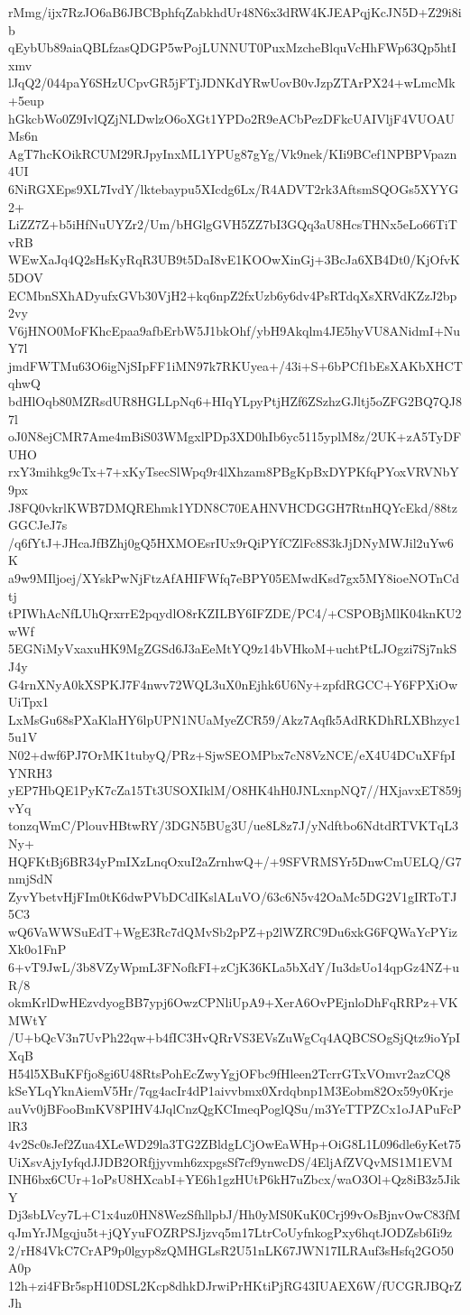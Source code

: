rMmg/ijx7RzJO6aB6JBCBphfqZabkhdUr48N6x3dRW4KJEAPqjKcJN5D+Z29i8ib
qEybUb89aiaQBLfzasQDGP5wPojLUNNUT0PuxMzcheBlquVcHhFWp63Qp5htIxmv
lJqQ2/044paY6SHzUCpvGR5jFTjJDNKdYRwUovB0vJzpZTArPX24+wLmcMk+5eup
hGkcbWo0Z9IvlQZjNLDwlzO6oXGt1YPDo2R9eACbPezDFkcUAIVljF4VUOAUMs6n
AgT7hcKOikRCUM29RJpyInxML1YPUg87gYg/Vk9nek/KIi9BCef1NPBPVpazn4UI
6NiRGXEps9XL7IvdY/lktebaypu5XIcdg6Lx/R4ADVT2rk3AftsmSQOGs5XYYG2+
LiZZ7Z+b5iHfNuUYZr2/Um/bHGlgGVH5ZZ7bI3GQq3aU8HcsTHNx5eLo66TiTvRB
WEwXaJq4Q2sHsKyRqR3UB9t5DaI8vE1KOOwXinGj+3BcJa6XB4Dt0/KjOfvK5DOV
ECMbnSXhADyufxGVb30VjH2+kq6npZ2fxUzb6y6dv4PsRTdqXsXRVdKZzJ2bp2vy
V6jHNO0MoFKhcEpaa9afbErbW5J1bkOhf/ybH9Akqlm4JE5hyVU8ANidmI+NuY7l
jmdFWTMu63O6igNjSIpFF1iMN97k7RKUyea+/43i+S+6bPCf1bEsXAKbXHCTqhwQ
bdHlOqb80MZRsdUR8HGLLpNq6+HIqYLpyPtjHZf6ZSzhzGJltj5oZFG2BQ7QJ87l
oJ0N8ejCMR7Ame4mBiS03WMgxlPDp3XD0hIb6yc5115yplM8z/2UK+zA5TyDFUHO
rxY3mihkg9cTx+7+xKyTsecSlWpq9r4lXhzam8PBgKpBxDYPKfqPYoxVRVNbY9px
J8FQ0vkrlKWB7DMQREhmk1YDN8C70EAHNVHCDGGH7RtnHQYcEkd/88tzGGCJeJ7s
/q6fYtJ+JHcaJfBZhj0gQ5HXMOEsrIUx9rQiPYfCZlFc8S3kJjDNyMWJil2uYw6K
a9w9MIljoej/XYskPwNjFtzAfAHIFWfq7eBPY05EMwdKsd7gx5MY8ioeNOTnCdtj
tPIWhAcNfLUhQrxrrE2pqydlO8rKZILBY6IFZDE/PC4/+CSPOBjMlK04knKU2wWf
5EGNiMyVxaxuHK9MgZGSd6J3aEeMtYQ9z14bVHkoM+uchtPtLJOgzi7Sj7nkSJ4y
G4rnXNyA0kXSPKJ7F4nwv72WQL3uX0nEjhk6U6Ny+zpfdRGCC+Y6FPXiOwUiTpx1
LxMsGu68sPXaKlaHY6lpUPN1NUaMyeZCR59/Akz7Aqfk5AdRKDhRLXBhzyc15u1V
N02+dwf6PJ7OrMK1tubyQ/PRz+SjwSEOMPbx7cN8VzNCE/eX4U4DCuXFfpIYNRH3
yEP7HbQE1PyK7cZa15Tt3USOXIklM/O8HK4hH0JNLxnpNQ7//HXjavxET859jvYq
tonzqWmC/PlouvHBtwRY/3DGN5BUg3U/ue8L8z7J/yNdftbo6NdtdRTVKTqL3Ny+
HQFKtBj6BR34yPmIXzLnqOxuI2aZrnhwQ+/+9SFVRMSYr5DnwCmUELQ/G7nmjSdN
ZyvYbetvHjFIm0tK6dwPVbDCdIKslALuVO/63c6N5v42OaMc5DG2V1gIRToTJ5C3
wQ6VaWWSuEdT+WgE3Rc7dQMvSb2pPZ+p2lWZRC9Du6xkG6FQWaYcPYizXk0o1FnP
6+vT9JwL/3b8VZyWpmL3FNofkFI+zCjK36KLa5bXdY/Iu3dsUo14qpGz4NZ+uR/8
okmKrlDwHEzvdyogBB7ypj6OwzCPNliUpA9+XerA6OvPEjnloDhFqRRPz+VKMWtY
/U+bQcV3n7UvPh22qw+b4fIC3HvQRrVS3EVsZuWgCq4AQBCSOgSjQtz9ioYpIXqB
H54l5XBuKFfjo8gi6U48RtsPohEcZwyYgjOFbc9fHleen2TcrrGTxVOmvr2azCQ8
kSeYLqYknAiemV5Hr/7qg4acIr4dP1aivvbmx0Xrdqbnp1M3Eobm82Ox59y0Krje
auVv0jBFooBmKV8PIHV4JqlCnzQgKCImeqPoglQSu/m3YeTTPZCx1oJAPuFcPlR3
4v2Sc0sJef2Zua4XLeWD29la3TG2ZBldgLCjOwEaWHp+OiG8L1L096dle6yKet75
UiXsvAjyIyfqdJJDB2ORfjjyvmh6zxpgsSf7cf9ynwcDS/4EljAfZVQvMS1M1EVM
INH6bx6CUr+1oPsU8HXcabI+YE6h1gzHUtP6kH7uZbcx/waO3Ol+Qz8iB3z5JikY
Dj3sbLVcy7L+C1x4uz0HN8WezSfhllpbJ/Hh0yMS0KuK0Crj99vOsBjnvOwC83fM
qJmYrJMgqju5t+jQYyuFOZRPSJjzvq5m17LtrCoUyfnkogPxy6hqtJODZsb6Ii9z
2/rH84VkC7CrAP9p0lgyp8zQMHGLsR2U51nLK67JWN17ILRAuf3sHsfq2GO50A0p
12h+zi4FBr5spH10DSL2Kcp8dhkDJrwiPrHKtiPjRG43IUAEX6W/fUCGRJBQrZJh
